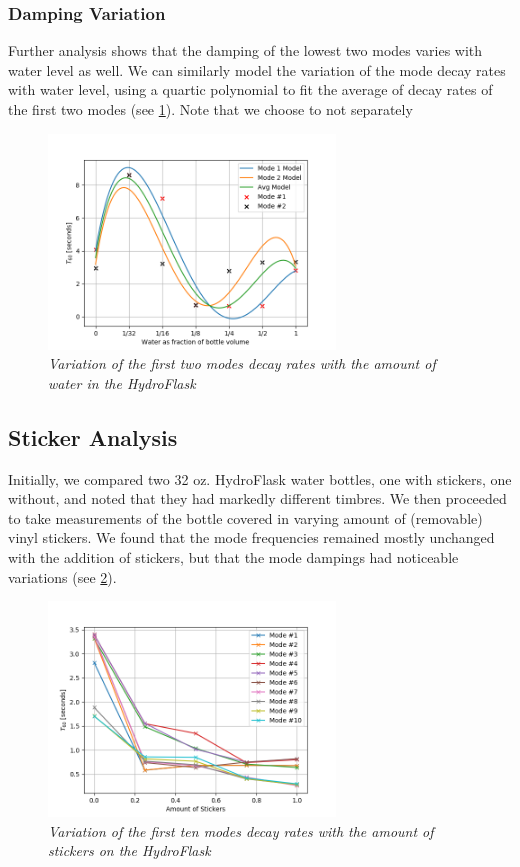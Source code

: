\documentclass[twoside,a4paper]{article}
\begin{document}
\subsubsection{Damping Variation} \label{sec:water-damp}
%
Further analysis shows that the damping of the lowest two modes
varies with water level as well. We can similarly model the
variation of the mode decay rates with water level, using a
quartic polynomial to fit the average of decay rates of the first
two modes (see \cref{fig:water-mode-damp}). Note that we choose
to not separately
%
\begin{figure}[!htb]
    \centering
    \includegraphics[width=3in]{../Figures/Water_Damping}
    \caption{\it{Variation of the first two modes decay rates
                 with the amount of water in the HydroFlask}}
    \label{fig:water-mode-damp}
\end{figure}
%
\subsection{Sticker Analysis} \label{sec:sticker}
%
Initially, we compared two 32 oz. HydroFlask water bottles, one
with stickers, one without, and noted that they had markedly different
timbres. We then proceeded to take measurements of the
bottle covered in varying amount of (removable) vinyl stickers. We found
that the mode frequencies remained mostly unchanged with the
addition of stickers, but that the mode dampings had noticeable
variations (see \cref{fig:sticker-mode-damp}).
%
\begin{figure}[!htb]
    \centering
    \includegraphics[width=3in]{../Figures/StickerDamping}
    \caption{\it{Variation of the first ten modes decay rates
                 with the amount of stickers on the HydroFlask}}
    \label{fig:sticker-mode-damp}
\end{figure}
%
\end{document}
